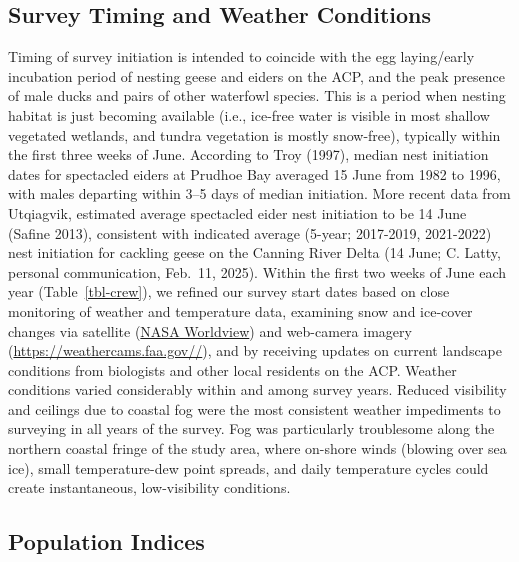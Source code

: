\documentclass[
]{article}
\begin{document}
\endgroup{}

\subsection*{Survey Timing and Weather
Conditions}\label{survey-timing-and-weather-conditions}

Timing of survey initiation is intended to coincide with the egg
laying/early incubation period of nesting geese and eiders on the ACP,
and the peak presence of male ducks and pairs of other waterfowl
species. This is a period when nesting habitat is just becoming
available (i.e., ice-free water is visible in most shallow vegetated
wetlands, and tundra vegetation is mostly snow-free), typically within
the first three weeks of June. According to Troy (1997), median nest
initiation dates for spectacled eiders at Prudhoe Bay averaged 15 June
from 1982 to 1996, with males departing within 3--5 days of median
initiation. More recent data from Utqiagvik, estimated average
spectacled eider nest initiation to be 14 June (Safine 2013), consistent
with indicated average (5-year; 2017-2019, 2021-2022) nest initiation
for cackling geese on the Canning River Delta (14 June; C. Latty,
personal communication, Feb.~11, 2025). Within the first two weeks of
June each year (Table~\ref{tbl-crew}), we refined our survey start dates
based on close monitoring of weather and temperature data, examining
snow and ice-cover changes via satellite
(\href{https://worldview.earthdata.nasa.gov/}{NASA Worldview}) and
web-camera imagery (\url{https://weathercams.faa.gov//}), and by
receiving updates on current landscape conditions from biologists and
other local residents on the ACP. Weather conditions varied considerably
within and among survey years. Reduced visibility and ceilings due to
coastal fog were the most consistent weather impediments to surveying in
all years of the survey. Fog was particularly troublesome along the
northern coastal fringe of the study area, where on-shore winds (blowing
over sea ice), small temperature-dew point spreads, and daily
temperature cycles could create instantaneous, low-visibility
conditions.

\subsection*{Population Indices}\label{population-indices}
\end{document}
